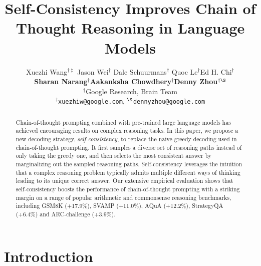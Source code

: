 \documentclass{article} %
\title{Self-Consistency Improves Chain of Thought Reasoning in Language Models}
\author{%
   Xuezhi Wang$^{\dag\ddag}$ \quad Jason Wei$^\dag$ \quad Dale Schuurmans$^\dag$\quad
   Quoc Le$^\dag$\quad Ed H. Chi$^\dag$ \quad\\
   \textbf{Sharan Narang$^\dag$\quad Aakanksha Chowdhery$^\dag$\quad  Denny Zhou$^{\dag\S}$} \\
   $^\dag$Google Research, Brain Team \\
   $^\ddag$\texttt{xuezhiw@google.com}, $^\S$\texttt{dennyzhou@google.com} \\
}
\begin{document}
\maketitle



\begin{abstract}
Chain-of-thought prompting combined with pre-trained large language models has achieved encouraging results on complex reasoning tasks. In this paper, we propose a new decoding strategy, \emph{self-consistency}, to replace the naive greedy decoding used in chain-of-thought prompting. It first samples a diverse set of reasoning paths instead of only taking the greedy one, and then selects the most consistent answer by marginalizing out the sampled reasoning paths. Self-consistency leverages the intuition that a complex reasoning problem typically admits multiple different ways of thinking leading to its unique correct answer.  Our extensive empirical evaluation shows that self-consistency boosts the performance of chain-of-thought prompting with a striking margin on a range of popular arithmetic and commonsense reasoning benchmarks, including GSM8K (+17.9\%), SVAMP (+11.0\%), AQuA (+12.2\%), StrategyQA (+6.4\%) and ARC-challenge (+3.9\%).

\end{abstract}

\section{Introduction}
\end{document}
